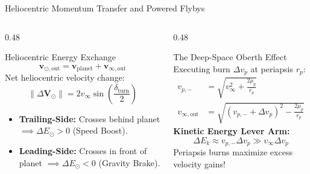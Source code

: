 \documentclass[aspectratio=169, 10pt]{beamer}
\begin{document}
\begin{frame}{Heliocentric Momentum Transfer and Powered Flybys}
    \begin{columns}[t]
        \begin{column}{0.48\textwidth}
            \begin{block}{Heliocentric Energy Exchange}
                \scriptsize
                \begin{equation*}
                    \mathbf{v}_{\odot,\text{out}} = \mathbf{v}_{\text{planet}} + \mathbf{v}_{\infty,\text{out}}
                \end{equation*}
                \vspace{-0.15cm}
                Net heliocentric velocity change:
                \begin{equation*}
                    \|\Delta \mathbf{V}_{\odot}\| = 2 v_\infty \sin\left(\frac{\delta_{\text{turn}}}{2}\right)
                \end{equation*}
                \vspace{-0.15cm}
                \begin{itemize}\setlength{\itemsep}{1pt}
                    \item \textbf{Trailing-Side:} Crosses behind planet $\implies \Delta E_\odot > 0$ (Speed Boost).
                    \item \textbf{Leading-Side:} Crosses in front of planet $\implies \Delta E_\odot < 0$ (Gravity Brake).
                \end{itemize}
            \end{block}
        \end{column}

        \begin{column}{0.48\textwidth}
            \begin{alertblock}{The Deep-Space Oberth Effect}
                \scriptsize
                Executing burn $\Delta v_p$ at periapsis $r_p$:
                \begin{align*}
                    v_{p,-} &= \sqrt{v_\infty^2 + \frac{2\mu_p}{r_p}} \\
                    v_{\infty,\text{out}} &= \sqrt{(v_{p,-} + \Delta v_p)^2 - \frac{2\mu_p}{r_p}}
                \end{align*}
                \vspace{-0.15cm}
                \textbf{Kinetic Energy Lever Arm:}
                \begin{equation*}
                    \Delta E_k \approx v_{p,-}\Delta v_p \gg v_\infty \Delta v_p
                \end{equation*}
                \vspace{-0.05cm}
                Periapsis burns maximize excess velocity gains!
            \end{alertblock}
        \end{column}
    \end{columns}
\end{frame}
\end{document}
